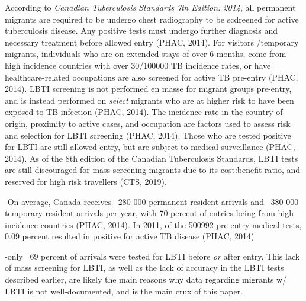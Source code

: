 \documentclass[sn-mathphys,Numbered]{sn-jnl}%
\theoremstyle{thmstyleone}%
\theoremstyle{thmstyletwo}%
\theoremstyle{thmstylethree}%
\begin{document}
     According to \textit{Canadian Tuberculosis Standards 7th Edition: 2014}, all permanent migrants %
     are required to be undergo chest radiography to be scdreened for active tuberculosis disease. Any positive tests must undergo further diagnosis and necessary treatment before allowed entry (PHAC, 2014). For visitors /temporary migrants, individuals who are on extended stays of over 6 months, come from high incidence countries with over 30/100000 TB incidence rates, or have healthcare-related occupations are also screened for active TB pre-entry (PHAC, 2014). LBTI screening is not performed en masse for migrant groups pre-entry, and is instead performed on \textit{select} migrants who are at higher risk to have been exposed to TB infection (PHAC, 2014). The incidence rate in the country of origin, proximity to active cases, and occupation are factors used to assess risk and selection for LBTI screening (PHAC, 2014). Those who are tested positive for LBTI are still allowed entry, but are subject to medical surveillance (PHAC, 2014). As of the 8th edition of the Canadian Tuberculosis Standards, LBTI tests are still discouraged for mass screening migrants due to its cost:benefit ratio, and reserved for high risk travellers (CTS, 2019).

    
     -On average, Canada receives ~280 000 permanent resident arrivals and ~380 000 temporary resident arrivals per year, with 70 percent of entries being from high incidence countries (PHAC, 2014). In 2011, of the 500992 pre-entry medical tests, 0.09 percent resulted in positive for active TB disease (PHAC, 2014)
     
     -only ~69 percent of arrivals were tested for LBTI before \textit{or} after entry. This lack of mass screening for LBTI, as well as the lack of accuracy in the LBTI tests described earlier, are likely the main reasons why data regarding migrants w/ LBTI is not well-documented, and is the main crux of this paper. %
\end{document}
